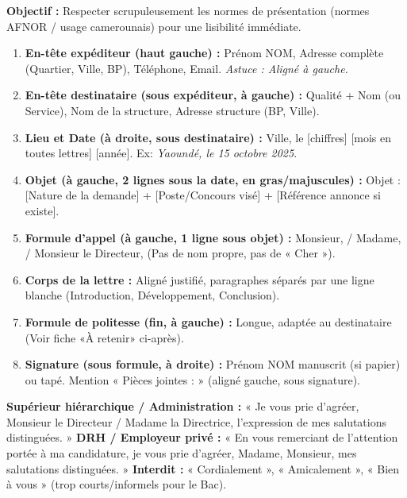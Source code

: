 \documentclass[11pt]{article}
\begin{document}
\begin{methode}
    \textbf{Objectif :} Respecter scrupuleusement les normes de présentation (normes AFNOR / usage camerounais) pour une lisibilité immédiate.
    \begin{enumerate}
        \item \textbf{En-tête expéditeur (haut gauche) :} Prénom NOM, Adresse complète (Quartier, Ville, BP), Téléphone, Email. \emph{Astuce : Aligné à gauche.}
        \item \textbf{En-tête destinataire (sous expéditeur, à gauche) :} Qualité + Nom (ou Service), Nom de la structure, Adresse structure (BP, Ville).
        \item \textbf{Lieu et Date (à droite, sous destinataire) :} Ville, le [chiffres] [mois en toutes lettres] [année]. Ex: \emph{Yaoundé, le 15 octobre 2025}.
        \item \textbf{Objet (à gauche, 2 lignes sous la date, en gras/majuscules) :} Objet : [Nature de la demande] + [Poste/Concours visé] + [Référence annonce si existe].
        \item \textbf{Formule d'appel (à gauche, 1 ligne sous objet) :} Monsieur, / Madame, / Monsieur le Directeur, (Pas de nom propre, pas de « Cher »).
        \item \textbf{Corps de la lettre :} Aligné justifié, paragraphes séparés par une ligne blanche (Introduction, Développement, Conclusion).
        \item \textbf{Formule de politesse (fin, à gauche) :} Longue, adaptée au destinataire (Voir fiche «À retenir» ci-après).
        \item \textbf{Signature (sous formule, à droite) :} Prénom NOM manuscrit (si papier) ou tapé. Mention « Pièces jointes : » (aligné gauche, sous signature).
    \end{enumerate}
\end{methode}

\begin{aretenir}
    \textbf{Supérieur hiérarchique / Administration :} « Je vous prie d'agréer, Monsieur le Directeur / Madame la Directrice, l'expression de mes salutations distinguées. »
    \textbf{DRH / Employeur privé :} « En vous remerciant de l'attention portée à ma candidature, je vous prie d'agréer, Madame, Monsieur, mes salutations distinguées. »
    \textbf{Interdit :} « Cordialement », « Amicalement », « Bien à vous » (trop courts/informels pour le Bac).
\end{aretenir}
\end{document}
